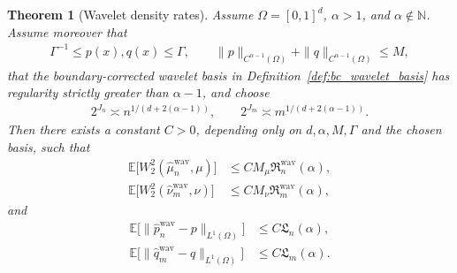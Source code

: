 \documentclass[11pt,reqno]{amsart}
\newtheorem{theorem}{Theorem}
\theoremstyle{definition}
\renewcommand{\hat}{\widehat}
\newcommand{\Ep}{\mathbb{E}}
\begin{document}
\begin{theorem}[Wavelet density rates]
\label{thm:uot_plugin_density_rates}
Assume $\Omega=[0,1]^d$, $\alpha>1$, and $\alpha\notin\mathbb N$.
Assume moreover that
\begin{align*}
    \Gamma^{-1} \le p(x),q(x) \le \Gamma,
    \qquad
    \|p\|_{C^{\alpha-1}(\Omega)}+\|q\|_{C^{\alpha-1}(\Omega)} \le M,
\end{align*}
that the boundary-corrected wavelet basis in Definition~\ref{def:bc_wavelet_basis} has regularity strictly greater than $\alpha-1$, and choose
\begin{align*}
    2^{J_n} \asymp n^{{1/(d+2(\alpha-1))}},
    \qquad
    2^{J_m} \asymp m^{{1/(d+2(\alpha-1))}}.
\end{align*}
Then there exists a constant $C>0$, depending only on $d,\alpha,M,\Gamma$ and the chosen basis, such that
\begin{align}
\label{eq:uot_plugin_wavelet_w2_source}
    \Ep\bigl[W_2^2(\hat\mu_n^{\mathrm{wav}},\mu)\bigr]
    &\le C M_\mu\mathfrak R_n^{\mathrm{wav}}(\alpha),
    \\
    \Ep\bigl[W_2^2(\hat\nu_m^{\mathrm{wav}},\nu)\bigr]
    &\le C M_\nu\mathfrak R_m^{\mathrm{wav}}(\alpha),
\end{align}
and
\begin{align}
    \Ep\bigl[\|\hat p_n^{\mathrm{wav}}-p\|_{L^1(\Omega)}\bigr]
    &\le C\mathfrak L_n(\alpha),
    \\
\label{eq:uot_plugin_wavelet_l1_target}
    \Ep\bigl[\|\hat q_m^{\mathrm{wav}}-q\|_{L^1(\Omega)}\bigr]
    &\le C\mathfrak L_m(\alpha).
\end{align}
\end{theorem}
\end{document}
